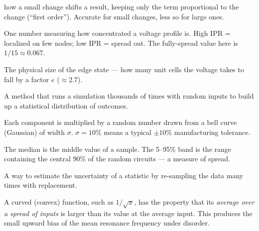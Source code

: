 \documentclass[11pt]{article}
\begin{document}
\begin{description}[leftmargin=0pt,itemsep=3pt,style=unboxed]
  how a small change shifts a result, keeping only the term proportional to
  the change (``first order''). Accurate for small changes, less so for
  large ones.
\item[Inverse participation ratio (IPR)] One number measuring how
  concentrated a voltage profile is. High IPR = localized on few nodes;
  low IPR = spread out. The fully-spread value here is $1/15\approx0.067$.
\item[Localization length $\xi$] The physical size of the edge state --- how
  many unit cells the voltage takes to fall by a factor $e$ ($\approx2.7$).
\item[Monte Carlo] A method that runs a simulation thousands of times with
  random inputs to build up a statistical distribution of outcomes.
\item[Gaussian disorder / $\sigma$] Each component is multiplied by a
  random number drawn from a bell curve (Gaussian) of width $\sigma$.
  $\sigma=10\%$ means a typical $\pm10\%$ manufacturing tolerance.
\item[Median / percentile / 5--95\% band] The median is the middle value
  of a sample. The 5--95\% band is the range containing the central 90\% of
  the random circuits --- a measure of spread.
\item[Bootstrap] A way to estimate the uncertainty of a statistic by
  re-sampling the data many times with replacement.
\item[Jensen's inequality / convexity] A curved (convex) function, such as
  $1/\sqrt{x}$, has the property that its \emph{average over a spread of
  inputs} is larger than its value at the average input. This produces the
  small upward bias of the mean resonance frequency under disorder.
\end{description}
\end{document}
